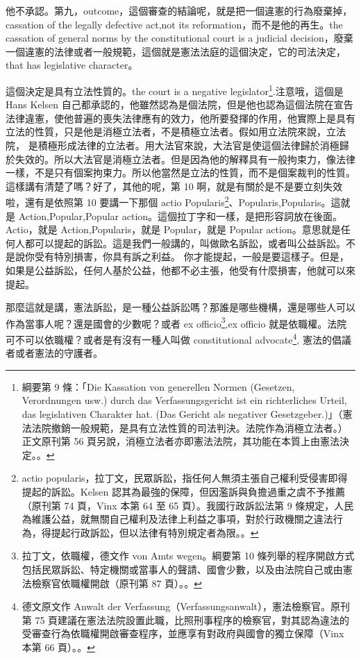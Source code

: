 \hypertarget{w05:cue:167}{}他不承認。第九，outcome，這個審查的結論呢，就是把一個違憲的行為廢棄掉，cassation of the legally defective act,not its reformation，而不是他的再生。the cassation of general norms by the constitutional court is a judicial decision，廢棄一個違憲的法律或者一般規範，這個就是憲法法庭的這個決定，它的司法決定，that has legislative character。

\hypertarget{w05:cue:168}{}這個決定是具有立法性質的。the court is a negative legislator\footnote{綱要第 9 條：「Die Kassation von generellen Normen (Gesetzen, Verordnungen usw.) durch das Verfassungsgericht ist ein richterliches Urteil, das legislativen Charakter hat. (Das Gericht als negativer Gesetzgeber.)」（憲法法院撤銷一般規範，是具有立法性質的司法判決。法院作為消極立法者。）正文原刊第 56 頁另說，消極立法者亦即憲法法院，其功能在本質上由憲法決定。\cite[87]{kelsen1929}。}.注意哦，這個是 Hans Kelsen 自己都承認的，他雖然認為是個法院，但是他也認為這個法院在宣告法律違憲，使他普遍的喪失法律應有的效力，他所要發揮的作用，他實際上是具有立法的性質，只是他是消極立法者，不是積極立法者。假如用立法院來說，立法院，
\hypertarget{w05:cue:169}{}是積極形成法律的立法者。用大法官來說，大法官是使這個法律歸於消極歸於失效的。所以大法官是消極立法者。但是因為他的解釋具有一般拘束力，像法律一樣，不是只有個案拘束力。所以他當然是立法的性質，而不是個案裁判的性質。這樣講有清楚了嗎？好了，其他的呢，第 10 啊，就是有關於是不是要立刻失效啦，還有是依照第 10 要講一下那個 actio
\hypertarget{w05:cue:170}{}Popularis\footnote{actio popularis，拉丁文，民眾訴訟，指任何人無須主張自己權利受侵害即得提起的訴訟。Kelsen 認其為最強的保障，但因濫訴與負擔過重之虞不予推薦（原刊第 74 頁，Vinx 本第 64 至 65 頁）。我國行政訴訟法第 9 條規定，人民為維護公益，就無關自己權利及法律上利益之事項，對於行政機關之違法行為，得提起行政訴訟，但以法律有特別規定者為限。\cite[74]{kelsen1929}。}、Popularis,Popularis。這就是 Action,Popular,Popular action。這個拉丁字和一樣，是把形容詞放在後面。Actio，就是 Action,Popularis，就是 Popular，就是 Popular action。意思就是任何人都可以提起的訴訟。這是我們一般講的，叫做歐名訴訟，或者叫公益訴訟。不是說你受有特別損害，你具有訴之利益。
\hypertarget{w05:cue:171}{}你才能提起，一般是要這樣子。但是，如果是公益訴訟，任何人基於公益，他都不必主張，他受有什麼損害，他就可以來提起。

\hypertarget{w05:cue:172}{}那麼這就是講，憲法訴訟，是一種公益訴訟嗎？那誰是哪些機構，還是哪些人可以作為當事人呢？還是國會的少數呢？或者 ex officio\footnote{拉丁文，依職權，德文作 von Amts wegen。綱要第 10 條列舉的程序開啟方式包括民眾訴訟、特定機關或當事人的聲請、國會少數，以及由法院自己或由憲法檢察官依職權開啟（原刊第 87 頁）。\cite[87]{kelsen1929}。},ex officio 就是依職權。法院可不可以依職權？或者是有沒有一種人叫做 constitutional advocate\footnote{德文原文作 Anwalt der Verfassung（Verfassungsanwalt），憲法檢察官。原刊第 75 頁建議在憲法法院設置此職，比照刑事程序的檢察官，對其認為違法的受審查行為依職權開啟審查程序，並應享有對政府與國會的獨立保障（Vinx 本第 66 頁）。\cite[75]{kelsen1929}。},
\hypertarget{w05:cue:173}{}憲法的倡議者或者憲法的守護者。

